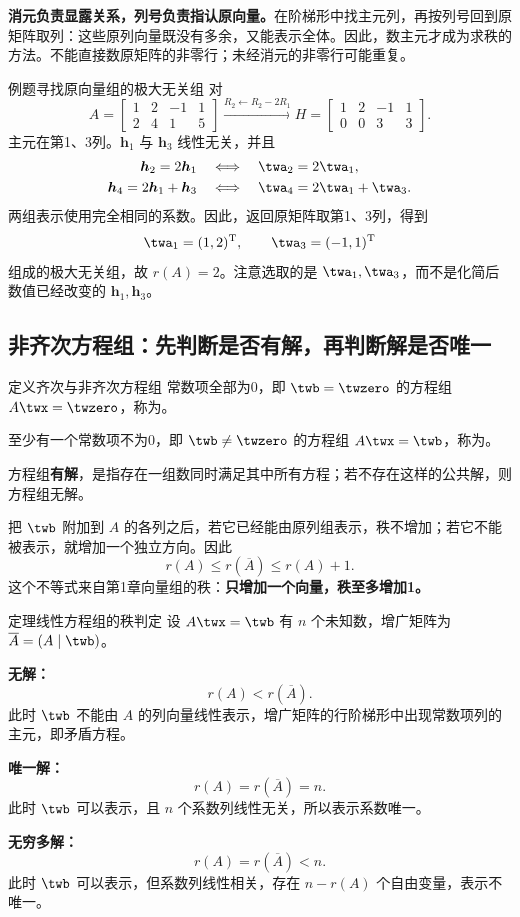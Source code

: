 \documentclass[a4paper,12pt,twoside,openany,fontset=none]{ctexbook}
\renewcommand{\le}{\leqslant}
\newcounter{theorem}[chapter]
\newenvironment{theorem}[1][]{\begin{thmBox}{定理}{#1}}{\end{thmBox}}
\newcounter{definition}[chapter]
\newenvironment{definition}[1][]{\begin{defBox}{定义}{#1}}{\end{defBox}}
\newcounter{example}[chapter]
\newenvironment{example}[1][]{\begin{exBox}{例题}{#1}}{\end{exBox}}
\numberwithin{equation}{chapter}
\begin{document}
\textbf{消元负责显露关系，列号负责指认原向量。}在阶梯形中找主元列，再按列号回到原矩阵取列：这些原列向量既没有多余，又能表示全体。因此，数主元才成为求秩的方法。不能直接数原矩阵的非零行；未经消元的非零行可能重复。

\begin{example}[寻找原向量组的极大无关组]
对
\[
 A=\begin{bmatrix}1&2&-1&1\\2&4&1&5\end{bmatrix}
 \xrightarrow{R_2\leftarrow R_2-2R_1}
 H=\begin{bmatrix}1&2&-1&1\\0&0&3&3\end{bmatrix}.
\]
主元在第1、3列。$\boldsymbol h_1$ 与 $\boldsymbol h_3$ 线性无关，并且
\[
\begin{aligned}
    \boldsymbol h_2=2\boldsymbol h_1
       &\quad\Longleftrightarrow\quad \twa_2=2\twa_1,\\
    \boldsymbol h_4=2\boldsymbol h_1+\boldsymbol h_3
       &\quad\Longleftrightarrow\quad \twa_4=2\twa_1+\twa_3.
\end{aligned}
\]
两组表示使用完全相同的系数。因此，返回原矩阵取第1、3列，得到
\[
    \twa_1=(1,2)^{\mathrm T},\qquad \twa_3=(-1,1)^{\mathrm T}
\]
组成的极大无关组，故 $r(A)=2$。注意选取的是 $\twa_1,\twa_3$，而不是化简后数值已经改变的 $\boldsymbol h_1,\boldsymbol h_3$。
\end{example}

\subsection*{非齐次方程组：先判断是否有解，再判断解是否唯一}

\begin{definition}[齐次与非齐次方程组]
常数项全部为0，即 $\twb=\twzero$ 的方程组 $A\twx=\twzero$，称为\textbf{}。

至少有一个常数项不为0，即 $\twb\ne\twzero$ 的方程组 $A\twx=\twb$，称为\textbf{}。

方程组\textbf{有解}，是指存在一组数同时满足其中所有方程；若不存在这样的公共解，则方程组无解。
\end{definition}

把 $\twb$ 附加到 $A$ 的各列之后，若它已经能由原列组表示，秩不增加；若它不能被表示，就增加一个独立方向。因此
\[
    r(A)\le r(\overline A)\le r(A)+1.
\]
这个不等式来自第1章向量组的秩：\textbf{只增加一个向量，秩至多增加1。}

\begin{theorem}[线性方程组的秩判定]
设 $A\twx=\twb$ 有 $n$ 个未知数，增广矩阵为 $\overline A=(A\mid\twb)$。

\textbf{无解：}
\[
    r(A)<r(\overline A).
\]
此时 $\twb$ 不能由 $A$ 的列向量线性表示，增广矩阵的行阶梯形中出现常数项列的主元，即矛盾方程。

\textbf{唯一解：}
\[
    r(A)=r(\overline A)=n.
\]
此时 $\twb$ 可以表示，且 $n$ 个系数列线性无关，所以表示系数唯一。

\textbf{无穷多解：}
\[
    r(A)=r(\overline A)<n.
\]
此时 $\twb$ 可以表示，但系数列线性相关，存在 $n-r(A)$ 个自由变量，表示不唯一。
\end{theorem}
\end{document}
